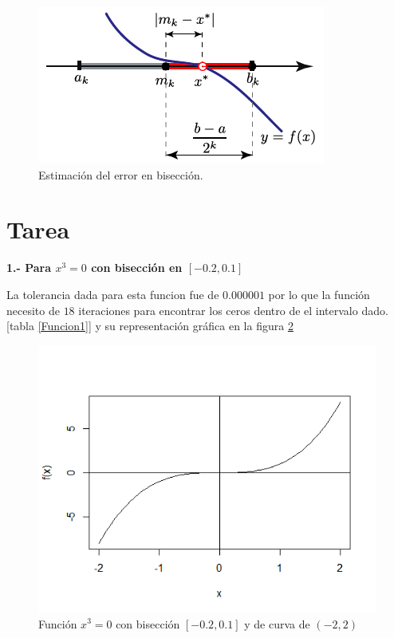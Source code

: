\documentclass[12pt,a4paper]{article}
\begin{document}
\begin{figure}[ht]
\centering
\includegraphics[scale=1]{MB_02}
\caption{Estimación del error en bisección.}
\label{fig:MB_02}
\end{figure}


\section{Tarea}

\textbf{1.- Para $x^3=0$ con bisección en $[-0.2,0.1]$} 

La tolerancia dada para esta funcion fue de $0.000001$ por lo que la función necesito de $18$ iteraciones para encontrar los ceros dentro de el intervalo dado. [tabla \ref{Funcion1}] y su representación gráfica en la figura \ref{fig:Funcion1}

\begin{figure}[h]
\centering
\includegraphics[scale=0.6]{Funcion1}
\caption{Función $x^3=0$ con bisección $[-0.2,0.1]$ y de curva de $(-2,2)$}
\label{fig:Funcion1}
\end{figure}
\end{document}
